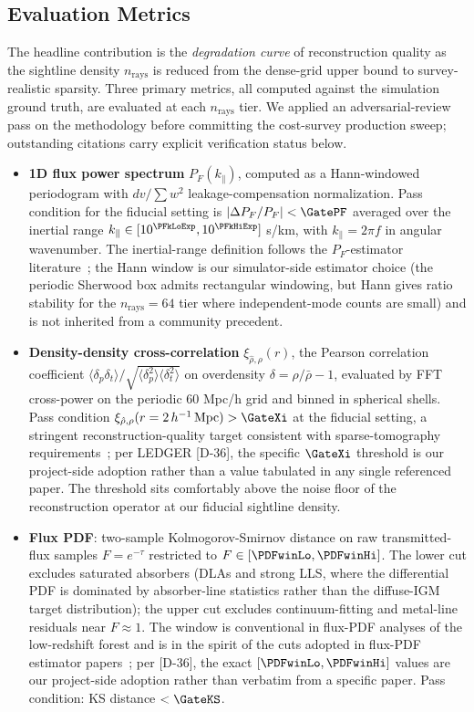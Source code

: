 \subsection{Evaluation Metrics}
The headline contribution is the \emph{degradation curve} of reconstruction quality as the sightline density $n_{\text{rays}}$ is reduced from the dense-grid upper bound to survey-realistic sparsity. Three primary metrics, all computed against the simulation ground truth, are evaluated at each $n_{\text{rays}}$ tier. We applied an adversarial-review pass on the methodology before committing the cost-survey production sweep; outstanding citations carry explicit verification status below.
\begin{itemize}
    \item \textbf{1D flux power spectrum} $P_F(k_\parallel)$, computed as a Hann-windowed periodogram with $dv / \sum w^2$ leakage-compensation normalization. Pass condition for the fiducial setting is $|\Delta P_F / P_F| < \GatePF$ averaged over the inertial range $k_\parallel \in [10^{\PFkLoExp}, 10^{\PFkHiExp}]$ s/km, with $k_\parallel = 2\pi f$ in angular wavenumber. The inertial-range definition follows the $P_F$-estimator literature~\cite{walther2018powerspectrum, boera2019thermal}; the Hann window is our simulator-side estimator choice (the periodic Sherwood box admits rectangular windowing, but Hann gives ratio stability for the $n_{\text{rays}} = 64$ tier where independent-mode counts are small) and is not inherited from a community precedent.
    \item \textbf{Density-density cross-correlation} $\xi_{\hat\rho, \rho}(r)$, the Pearson correlation coefficient $\langle \delta_p \delta_t \rangle / \sqrt{\langle \delta_p^2 \rangle \langle \delta_t^2 \rangle}$ on overdensity $\delta = \rho/\bar\rho - 1$, evaluated by FFT cross-power on the periodic 60 Mpc/h grid and binned in spherical shells. Pass condition $\xi_{\hat\rho, \rho}(r = 2\,h^{-1}\,\text{Mpc}) > \GateXi$ at the fiducial setting, a stringent reconstruction-quality target consistent with sparse-tomography requirements~\cite{lee2015, stark2015tomography}; per LEDGER [D-36], the specific $\GateXi$ threshold is our project-side adoption rather than a value tabulated in any single referenced paper. The threshold sits comfortably above the noise floor of the reconstruction operator at our fiducial sightline density.
    \item \textbf{Flux PDF}: two-sample Kolmogorov-Smirnov distance on raw transmitted-flux samples $F = e^{-\tau}$ restricted to $F \in [\PDFwinLo, \PDFwinHi]$. The lower cut excludes saturated absorbers (DLAs and strong LLS, where the differential PDF is dominated by absorber-line statistics rather than the diffuse-IGM target distribution); the upper cut excludes continuum-fitting and metal-line residuals near $F \approx 1$. The window is conventional in flux-PDF analyses of the low-redshift forest and is in the spirit of the cuts adopted in flux-PDF estimator papers~\cite{lee2015}; per [D-36], the exact $[\PDFwinLo, \PDFwinHi]$ values are our project-side adoption rather than verbatim from a specific paper. Pass condition: KS distance $< \GateKS$.
\end{itemize}
